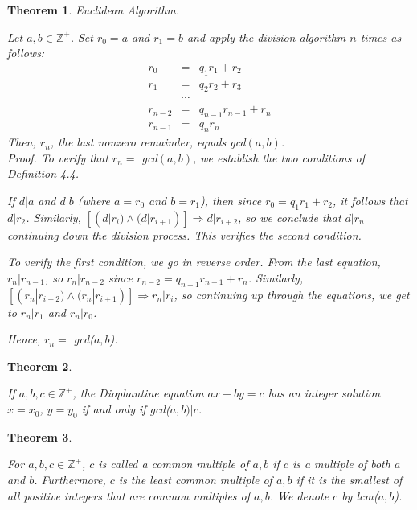 \documentclass[12pt]{article}
\newtheorem{theorem}{Theorem} [section]
\begin{document}
\begin{theorem} Euclidean Algorithm.
\begin{em}
Let $a, b \in \mathbb{Z}^+$. Set $r_0 = a$ and $r_1 = b$ and apply the division algorithm $n$ times as follows:
\begin{eqnarray*}
r_0 &=& q_1r_1 + r_2\\
r_1 &=& q_2r_2 + r_3\\
&\cdots&\\
r_{n-2} &=& q_{n-1}r_{n-1} + r_n\\
r_{n-1} &=& q_nr_n
\end{eqnarray*}
Then, $r_n$, the last nonzero remainder, equals gcd$(a, b)$.\\
\emph{Proof.} To verify that $r_n =$ gcd$(a, b)$, we establish the two conditions of Definition 4.4.

If $d|a$ and $d|b$ (where $a=r_0$ and $b=r_1$), then since $r_0=q_1r_1 + r_2$, it follows that $d|r_2$. Similarly, $[(d|r_i) \wedge (d|r_{i+1})] \Rightarrow d|r_{i+2}$, so we conclude that $d|r_n$ continuing down the division process. This verifies the second condition.

To verify the first condition, we go in reverse order. From the last equation, $r_n|r_{n-1}$, so $r_n|r_{n-2}$ since $r_{n-2} = q_{n-1}r_{n-1} + r_n$. Similarly, $[(r_n|r_{i+2}) \wedge (r_n|r_{i+1})] \Rightarrow r_n|r_i$, so continuing up through the equations, we get to $r_n|r_1$ and $r_n|r_0$.

Hence, $r_n =$ gcd($a, b$).
\end{em}
\end{theorem}
\begin{theorem}
\begin{em}
If $a, b, c \in \mathbb{Z}^+$, the Diophantine equation $ax+by=c$ has an integer solution $x=x_0$, $y=y_0$ if and only if gcd($a, b) | c$.
\end{em}
\end{theorem}
\begin{theorem}
\begin{em}
For $a,b,c \in \mathbb{Z}^+$, $c$ is called a \emph{common multiple} of $a, b$ if $c$ is a multiple of both $a$ and $b$. Furthermore, $c$ is the \emph{least common multiple} of $a, b$ if it is the smallest of all positive integers that are common multiples of $a, b$. We denote $c$ by lcm($a, b$).
\end{em}
\end{theorem}
\end{document}
